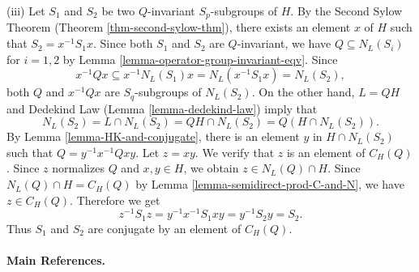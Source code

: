 \begin{sketch}
		(iii) Let $S_1$ and $S_2$ be two $Q$-invariant $S_p$-subgroups of $H$. By the Second Sylow Theorem (Theorem \ref{thm-second-sylow-thm}), there exists an element $x$ of $H$ such that $S_2 = x^{-1}S_1x$. Since both $S_1$ and $S_2$ are $Q$-invariant, we have $Q \subseteq N_L(S_i)$ for $i=1,2$ by Lemma \ref{lemma-operator-group-invariant-eqv}. Since
		$$x^{-1}Qx \subseteq x^{-1}N_L(S_1)x = N_L(x^{-1}S_1x) = N_L(S_2),$$
		both $Q$ and $x^{-1}Qx$ are $S_q$-subgroups of $N_L(S_2)$.  On the other hand, $L = QH$ and Dedekind Law (Lemma \ref{lemma-dedekind-law}) imply that
		$$N_L(S_2) = L \cap N_L(S_2) = QH \cap N_L(S_2) = Q(H \cap N_L(S_2)).$$
		By Lemma \ref{lemma-HK-and-conjugate}, there is an element $y$ in $H \cap N_L(S_2)$ such that $Q = y^{-1}x^{-1}Qxy$. Let $z = xy$. We verify that $z$ is an element of $C_H(Q)$. Since $z$ normalizes $Q$ and $x,y\in H$, we obtain $z \in N_L(Q) \cap H$. Since $N_L(Q) \cap H = C_H(Q)$ by Lemma \ref{lemma-semidirect-prod-C-and-N}, we have $z \in C_H(Q)$.  Therefore we get
		$$z^{-1}S_1z = y^{-1}x^{-1}S_1xy =y^{-1}S_2y = S_2.$$
		Thus $S_1$ and $S_2$ are conjugate by an element of $C_H(Q)$.
\end{sketch} 

\paragraph{Main References.} \cite{DummitFoote2004,Suzuki1982,Rotman1995,Alperin1995,Dixon1996}
